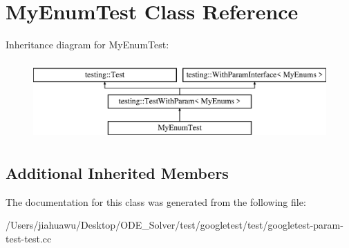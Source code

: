 \hypertarget{class_my_enum_test}{}\section{My\+Enum\+Test Class Reference}
\label{class_my_enum_test}
Inheritance diagram for My\+Enum\+Test\+:\begin{figure}[H]
\begin{center}
\leavevmode
\includegraphics[height=3.000000cm]{class_my_enum_test}
\end{center}
\end{figure}
\subsection*{Additional Inherited Members}


The documentation for this class was generated from the following file\+:\begin{DoxyCompactItemize}
\item 
/\+Users/jiahuawu/\+Desktop/\+O\+D\+E\+\_\+\+Solver/test/googletest/test/googletest-\/param-\/test-\/test.\+cc\end{DoxyCompactItemize}
